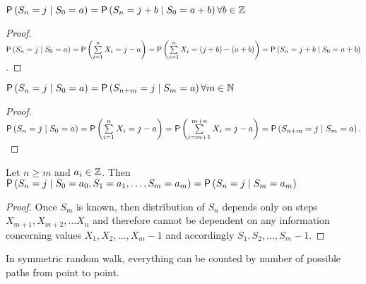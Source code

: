\begin{lemma}\label{thm-spatial_homogeneity}
 $\operatorname{\textsf{P}} \left( S_n=j \mid S_0=a \right) =\operatorname{\textsf{P}} \left( S_n=j+b \mid S_0=a+b \right) \forall b \in \mathbb{Z}$
\end{lemma}
\begin{proof}
 $\pr \left( S_n=j \mid S_0=a \right) =\pr \left( \suma X_i=j-a \right) =\pr \left( \suma X_i= \left( j+b \right) - \left( a+b \right) \right) =\pr \left( S_n=j+b \mid S_0=a+b \right)$.
\end{proof}

\begin{lemma}\label{thm-temporal_homogeneity}
 $\operatorname{\textsf{P}} \left( S_n=j \mid S_0=a \right) =\operatorname{\textsf{P}} \left( S_{n+m}=j \mid S_m=a \right) \forall m \in \mathbb{N}$
\end{lemma}
\begin{proof}
 $\pr \left( S_n=j \mid S_0=a \right) =\pr \left( \suma X_i=j-a \right) =\pr \left( \suma[i][m+1][m+n]X_i=j-a \right) =\pr \left( S_{n+m}=j \mid S_m=a \right).$
\end{proof}

\begin{lemma}\label{thm-markov_property}
 Let $n\geq m$ and $a_i \in \mathbb{Z}$. Then $\operatorname{\textsf{P}} \left( S_n=j \mid S_0=a_0, S_1=a_1, \ldots, S_m=a_m \right) =\operatorname{\textsf{P}} \left( S_n=j \mid S_m=a_m \right) $
\end{lemma}
\begin{proof}
 Once $S_m$ is known, then distribution of $S_n$ depends only on steps $X_{m+1}, X_{m+2}, \ldots X_n$ and therefore cannot be dependent on any information concerning values $X_1, X_2, \ldots, X_m-1$ and accordingly $S_1, S_2, \ldots, S_m-1.$
\end{proof}

\begin{rem}
 In symmetric random walk, everything can be counted by number of possible paths from point to point.
\end{rem}

